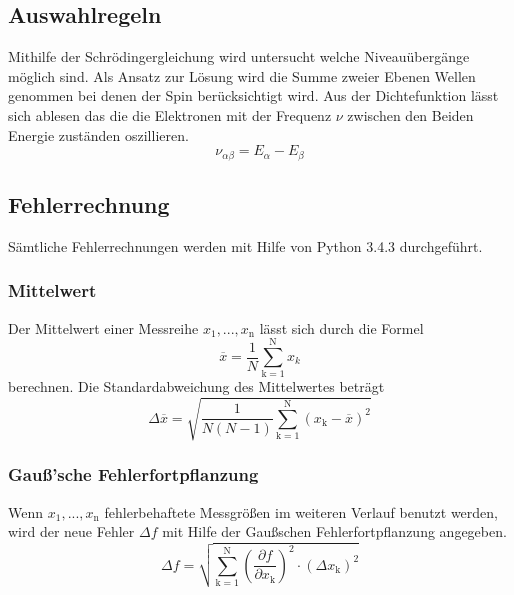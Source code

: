 \subsection{Auswahlregeln}
Mithilfe der Schrödingergleichung wird untersucht welche Niveauübergänge möglich sind. Als Ansatz zur Lösung wird die Summe zweier Ebenen Wellen genommen bei denen der Spin berücksichtigt wird. Aus der Dichtefunktion lässt sich ablesen das die die Elektronen mit der Frequenz $\nu$ zwischen den Beiden Energie zuständen oszillieren.
\begin{equation}
  \nu_{\alpha\beta}=E_{\alpha} - E_{\beta}
  \label{eqn:nu}
\end{equation}

\subsection{Fehlerrechnung}
Sämtliche Fehlerrechnungen werden mit Hilfe von Python 3.4.3 durchgeführt.
\subsubsection{Mittelwert}
Der Mittelwert einer Messreihe $x_\text{1}, ... ,x_\text{n}$ lässt sich durch die Formel
\begin{equation}
	\overline{x} = \frac{1}{N} \sum_{\text{k}=1}^\text{N} x_k
	\label{eqn:ave}
\end{equation}
berechnen. Die Standardabweichung des Mittelwertes beträgt
\begin{equation}
	\Delta \overline{x} = \sqrt{ \frac{1}{N(N-1)} \sum_{\text{k}=1}^\text{N} (x_\text{k} - \overline{x})^2}
	\label{eqn:std}
\end{equation}

\subsubsection{Gauß'sche Fehlerfortpflanzung}
Wenn $x_\text{1}, ..., x_\text{n}$ fehlerbehaftete Messgrößen im weiteren Verlauf benutzt werden, wird der neue Fehler $\Delta f$ mit Hilfe der Gaußschen Fehlerfortpflanzung angegeben.
\begin{equation}
	\Delta f = \sqrt{\sum_{\text{k}=1}^\text{N} \left( \frac{ \partial f}{\partial x_\text{k}} \right) ^2 \cdot (\Delta x_\text{k})^2}
	\label{eqn:var}
\end{equation}

